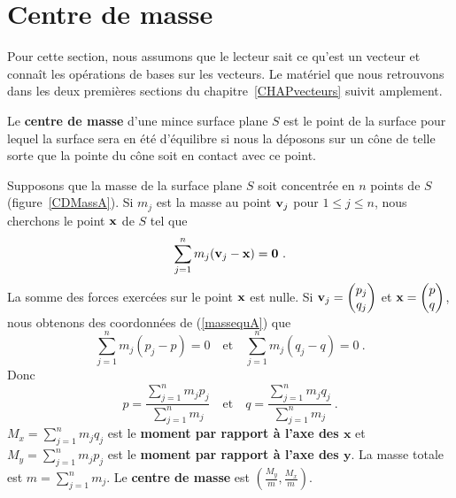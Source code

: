 {\section{Centre de masse \eng}

Pour cette section, nous assumons que le lecteur sait ce qu'est un vecteur
et connaît les opérations de bases sur les vecteurs.  Le matériel que
nous retrouvons dans les deux premières sections du
chapitre~\ref{CHAPvecteurs} suivit amplement.

Le {\bfseries centre de masse} d'une mince
surface plane $S$ est le point de la surface pour lequel la surface
sera en été d'équilibre si nous la déposons sur un cône de telle sorte que
la pointe du cône soit en contact avec ce point.  


Supposons que la masse de la surface plane $S$ soit concentrée en $n$ points
de $S$ (figure~\ref{CDMassA}).  Si $m_j$ est la masse au point
$\mathbf{v}_j$ pour $1\leq j \leq n$, nous cherchons le point $\mathbf{x}$
de $S$ tel que
\begin{equation} \label{massequA}
\sum_{j=1}^n m_j(\mathbf{v}_j-\mathbf{x}) = \mathbf{0} \ .
\end{equation}
La somme des forces exercées sur le point $\mathbf{x}$ est nulle.  Si
$\displaystyle \mathbf{v}_j = \begin{pmatrix} p_j \\ q_j \end{pmatrix}$ et
$\mathbf{x} = \begin{pmatrix} p \\ q \end{pmatrix}$, nous obtenons des coordonnées
de (\ref{massequA}) que
\[
\sum_{j=1}^n m_j (p_j - p) = 0 \quad \text{et} \quad
\sum_{j=1}^n m_j (q_j - q) = 0 \ .
\]
Donc
\[
p = \frac{\sum_{j=1}^n m_j p_j}{\sum_{j=1}^n m_j} \quad \text{et} \quad
q = \frac{\sum_{j=1}^n m_j q_j}{\sum_{j=1}^n m_j} \ .
\]
$\displaystyle M_x = \sum_{j=1}^n m_j q_j$ est le
{\bfseries moment par rapport à l'axe des $\mathbf x$}
et $\displaystyle M_y = \sum_{j=1}^n m_j p_j$ est le
{\bfseries moment par rapport à l'axe des $\mathbf y$}.  La masse totale est
$\displaystyle m = \sum_{j=1}^n m_j$.  Le
{\bfseries centre de masse} est
$\displaystyle \left( \frac{M_y}{m} , \frac{M_x}{m}\right)$.

}
